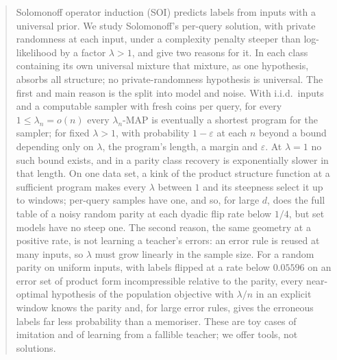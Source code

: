 \begin{abstract}
Solomonoff operator induction (SOI) predicts labels from inputs with a universal prior. We study Solomonoff's per-query solution, with private randomness at each input, under a complexity penalty steeper than log-likelihood by a factor $\lambda>1$, and give two reasons for it. In each class containing its own universal mixture that mixture, as one hypothesis, absorbs all structure; no private-randomness hypothesis is universal. The first and main reason is the split into model and noise. With i.i.d.\ inputs and a computable sampler with fresh coins per query, for every $1\le\lambda_n=o(n)$ every $\lambda_n$-MAP is eventually a shortest program for the sampler; for fixed $\lambda>1$, with probability $1-\varepsilon$ at each $n$ beyond a bound depending only on $\lambda$, the program's length, a margin and $\varepsilon$. At $\lambda=1$ no such bound exists, and in a parity class recovery is exponentially slower in that length. On one data set, a kink of the product structure function at a sufficient program makes every $\lambda$ between $1$ and its steepness select it up to windows; per-query samples have one, and so, for large $d$, does the full table of a noisy random parity at each dyadic flip rate below $1/4$, but set models have no steep one. The second reason, the same geometry at a positive rate, is not learning a teacher's errors: an error rule is reused at many inputs, so $\lambda$ must grow linearly in the sample size. For a random parity on uniform inputs, with labels flipped at a rate below $0.05596$ on an error set of product form incompressible relative to the parity, every near-optimal hypothesis of the population objective with $\lambda/n$ in an explicit window knows the parity and, for large error rules, gives the erroneous labels far less probability than a memoriser. These are toy cases of imitation and of learning from a fallible teacher; we offer tools, not solutions.
\end{abstract}
